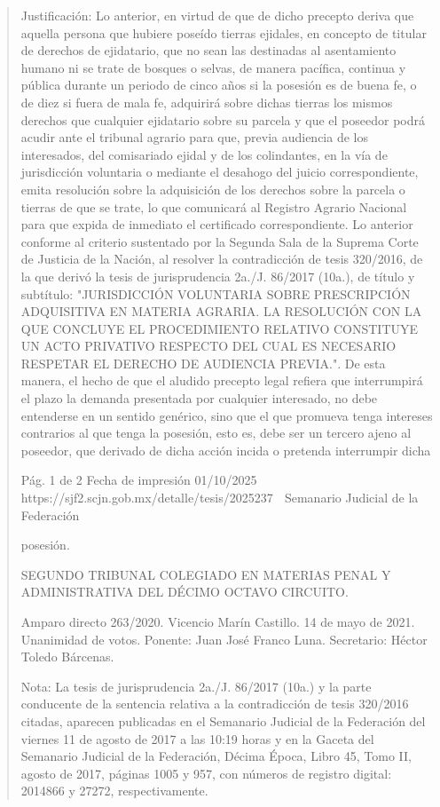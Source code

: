 \documentclass[11pt,a4paper]{article}
\begin{document}
\begin{quote}
Justificación: Lo anterior, en virtud de que de dicho precepto deriva que aquella persona que
hubiere poseído tierras ejidales, en concepto de titular de derechos de ejidatario, que no sean las
destinadas al asentamiento humano ni se trate de bosques o selvas, de manera pacífica, continua y
pública durante un periodo de cinco años si la posesión es de buena fe, o de diez si fuera de mala
fe, adquirirá sobre dichas tierras los mismos derechos que cualquier ejidatario sobre su parcela y
que el poseedor podrá acudir ante el tribunal agrario para que, previa audiencia de los interesados,
del comisariado ejidal y de los colindantes, en la vía de jurisdicción voluntaria o mediante el
desahogo del juicio correspondiente, emita resolución sobre la adquisición de los derechos sobre la
parcela o tierras de que se trate, lo que comunicará al Registro Agrario Nacional para que expida de
inmediato el certificado correspondiente. Lo anterior conforme al criterio sustentado por la Segunda
Sala de la Suprema Corte de Justicia de la Nación, al resolver la contradicción de tesis 320/2016, de
la que derivó la tesis de jurisprudencia 2a./J. 86/2017 (10a.), de título y subtítulo: "JURISDICCIÓN
VOLUNTARIA SOBRE PRESCRIPCIÓN ADQUISITIVA EN MATERIA AGRARIA. LA RESOLUCIÓN
CON LA QUE CONCLUYE EL PROCEDIMIENTO RELATIVO CONSTITUYE UN ACTO PRIVATIVO
RESPECTO DEL CUAL ES NECESARIO RESPETAR EL DERECHO DE AUDIENCIA PREVIA.".
De esta manera, el hecho de que el aludido precepto legal refiera que interrumpirá el plazo la
demanda presentada por cualquier interesado, no debe entenderse en un sentido genérico, sino
que el que promueva tenga intereses contrarios al que tenga la posesión, esto es, debe ser un
tercero ajeno al poseedor, que derivado de dicha acción incida o pretenda interrumpir dicha


                                              Pág. 1 de 2             Fecha de impresión 01/10/2025
  https://sjf2.scjn.gob.mx/detalle/tesis/2025237
                                                  Semanario Judicial de la Federación

posesión.

SEGUNDO TRIBUNAL COLEGIADO EN MATERIAS PENAL Y ADMINISTRATIVA DEL DÉCIMO
OCTAVO CIRCUITO.


Amparo directo 263/2020. Vicencio Marín Castillo. 14 de mayo de 2021. Unanimidad de votos.
Ponente: Juan José Franco Luna. Secretario: Héctor Toledo Bárcenas.

Nota: La tesis de jurisprudencia 2a./J. 86/2017 (10a.) y la parte conducente de la sentencia relativa
a la contradicción de tesis 320/2016 citadas, aparecen publicadas en el Semanario Judicial de la
Federación del viernes 11 de agosto de 2017 a las 10:19 horas y en la Gaceta del Semanario
Judicial de la Federación, Décima Época, Libro 45, Tomo II, agosto de 2017, páginas 1005 y 957,
con números de registro digital: 2014866 y 27272, respectivamente.



\end{quote}
\end{document}

